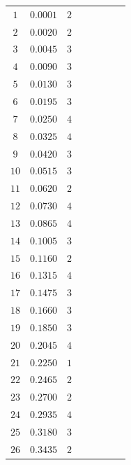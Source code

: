 \documentclass[12pt, a4paper]{article}
\begin{document}
\begin{table}[!htb]
{\begin{tabular}{|c|c|c|c|c|c|c|c|}
    &&&&&&&\\
\hline
\hline
    \footnotesize $1$ &\footnotesize $0.0001$ & $2$& &&&&\\
    \footnotesize $2$& \footnotesize$0.0020$  & $2$& &&&&\\
    \footnotesize $3 $& \footnotesize$0.0045$ & $3$& &&&&\\
    \footnotesize $4 $& \footnotesize$0.0090$ & $3$& &&&&\\
    \footnotesize $5 $& \footnotesize$0.0130$ & $3$& &&&&\\
    \footnotesize $6 $&\footnotesize$0.0195$  & $3$& &&&&\\
    \footnotesize $7 $&\footnotesize$0.0250$  & $4$& &&&&\\
    \footnotesize $8 $& \footnotesize$0.0325$ & $4$& &&&&\\
    \footnotesize $9 $&\footnotesize$0.0420$  & $3$& &&&&\\
    \footnotesize $10 $& \footnotesize$0.0515$& $3$& &&&&\\
    \footnotesize $11 $& \footnotesize$0.0620$& $2$& &&&&\\ 
    \footnotesize $12 $&\footnotesize $0.0730$& $4$& &&&&\\
    \footnotesize $13 $& \footnotesize$0.0865$& $4$& &&&&\\
    \footnotesize $14 $& \footnotesize$0.1005$& $3$& &&&&\\
    \footnotesize $15 $& \footnotesize$0.1160$& $2$& &&&&\\
    \footnotesize $16 $& \footnotesize$0.1315$& $4$& &&&&\\
    \footnotesize $17 $& \footnotesize$0.1475$& $3$& &&&&\\
    \footnotesize $18 $& \footnotesize$0.1660$& $3$& &&&&\\
    \footnotesize $19 $& \footnotesize$0.1850$& $3$& &&&&\\
    \footnotesize $20 $& \footnotesize$0.2045$& $4$& &&&&\\
    \footnotesize $21 $&\footnotesize $0.2250$& $1$& &&&&\\
    \footnotesize $22 $& \footnotesize$0.2465$& $2$& &&&&\\
    \footnotesize $23 $& \footnotesize$0.2700$& $2$& &&&&\\
    \footnotesize $24 $& \footnotesize$0.2935$& $4$& &&&&\\
    \footnotesize $25 $& \footnotesize$0.3180$& $3$& &&&&\\
    \footnotesize $26 $& \footnotesize$0.3435$& $2$& &&&&\\

\end{tabular}}
\end{table}
\end{document}
